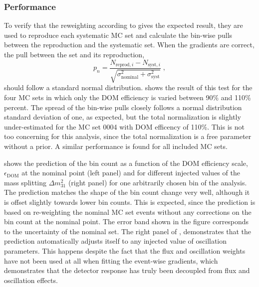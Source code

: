 \subsubsection{Performance}
To verify that the reweighting according to  gives the expected result, they are used to reproduce each systematic MC set and calculate the bin-wise pulls between the reproduction and the systematic set.
When the gradients are correct, the pull between the set and its reproduction,
$$p_n = \frac{N_{\mathrm{reprod}, i} - N_{\mathrm{syst}, i}}{\sqrt{\sigma^2_\mathrm{nominal} + \sigma^2_{\mathrm{syst}}}}\;,$$
should follow a standard normal distribution.
 shows the result of this test for the four MC sets in which only the DOM efficiency is varied between 90\% and 110\% percent.
The spread of the bin-wise pulls closely follows a normal distribution standard deviation of one, as expected, but the total normalization is slightly under-estimated for the MC set 0004 with DOM efficency of 110\%.
This is not too concerning for this analysis, since the total normalization is a free parameter without a prior.
A similar performance is found for all included MC sets.

 shows the prediction of the bin count as a function of the DOM efficiency scale, $\epsilon_{\mathrm{DOM}}$ at the nominal point (left panel) and for different injected values of the mass splitting $\Delta m^2_{31}$ (right panel) for one arbitrarily chosen bin of the analysis.
The prediction matches the shape of the bin count change very well, although it is offset slightly towards lower bin counts.
This is expected, since the prediction is based on re-weighting the nominal MC set events without any corrections on the bin count at the nominal point.
The error band shown in the figure corresponds to the uncertainty of the nominal set.
The right panel of , demonstrates that the prediction automatically adjusts itself to any injected value of oscillation parameters.
This happens despite the fact that the flux and oscillation weights have not been used at all when fitting the event-wise gradients, which demonstrates that the detector response has truly been decoupled from flux and oscillation effects.

